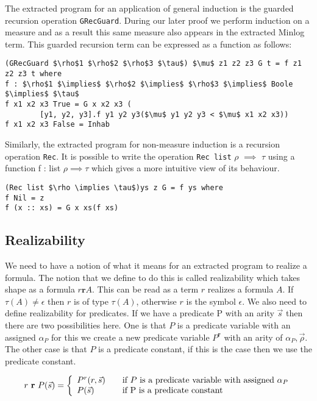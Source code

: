 The extracted program for an application of general induction is the guarded recursion operation \texttt{GRecGuard}. During our later proof we perform induction on a measure and as a result this same measure also appears in the extracted Minlog term.  This guarded recursion term can be expressed as a function as follows:

\begin{lstlisting}[mathescape]
(GRecGuard $\rho$1 $\rho$2 $\rho$3 $\tau$) $\mu$ z1 z2 z3 G t = f z1 z2 z3 t where
f : $\rho$1 $\implies$ $\rho$2 $\implies$ $\rho$3 $\implies$ Boole $\implies$ $\tau$
f x1 x2 x3 True = G x x2 x3 (
        [y1, y2, y3].f y1 y2 y3($\mu$ y1 y2 y3 < $\mu$ x1 x2 x3))
f x1 x2 x3 False = Inhab
\end{lstlisting}


Similarly, the extracted program for non-measure induction is a recursion operation \texttt{Rec}. It is possible to write the operation \texttt{Rec list} $\rho$ $\implies$ $\tau$ using a function
f : list $\rho \implies \tau$ which gives a more intuitive view of its behaviour.
\begin{lstlisting}[mathescape]
(Rec list $\rho \implies \tau$)ys z G = f ys where
f Nil = z
f (x :: xs) = G x xs(f xs)
\end{lstlisting}

\subsection*{Realizability}
We need to have a notion of what it means for an extracted program to realize
a formula. The notion that we define to do this is called realizability which takes shape as a formula $r \textbf{r} A$. This can be read as
a term $r$ realizes a formula $A$. If $\tau(A) \neq \epsilon$ then $r$ is of type $\tau (A)$,
otherwise $r$ is the symbol $\epsilon$. We also need to define realizability
for predicates. If we have a predicate P
with an arity $\vec{s}$ then there are two possibilities here. One is that
$P$ is a predicate variable with an assigned $\alpha_P$ for this we create a new
predicate variable $P^{\textbf{r}}$ with an arity of $\alpha_P,\vec{\rho}$. 
The other case is that $P$ is a predicate constant, if this is the case then
we use the predicate constant.



\[ r \ \textbf{r} \ P(\vec{s}) = \left\{ 
\begin{array}{l l}
P^r(r,\vec{s}) & \quad \text{if $P$ is a predicate variable with assigned $\alpha_P$} \\ 
P(\vec{s}) & \quad \text{if P is a predicate constant} \\

\end{array} \right.
\]

